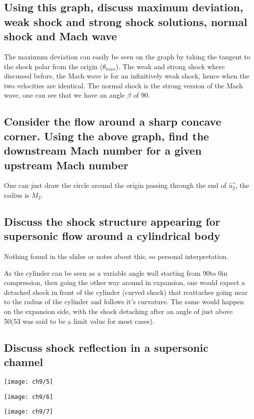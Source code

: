 \documentclass[british,french,11pt, a4paper, openany]{article}
\begin{document}
\subsection{Using this graph, discuss maximum deviation, weak shock and strong shock solutions, normal shock and Mach wave}
The maximum deviation can easily be seen on the graph by taking the tangent to the shock polar from the origin ($\theta_{max}$). The weak and strong shock where discussed before, the Mach wave is for an infinitively weak shock, hence when the two velocities are identical. The normal shock is the strong version of the Mach wave, one can see that we have an angle $\beta$ of 90\degres .

\subsection{Consider the flow around a sharp concave corner. Using the above graph,	find the downstream Mach number for a given upstream Mach number}
One can just draw the circle around the origin passing through the end of $\vec{u_2}$, the radius is $M_2$.

\subsection{Discuss the shock structure appearing for supersonic flow around a cylindrical body}
Nothing found in the slides or notes about this, so personal interpretation.

As the cylinder can be seen as a variable angle wall starting from 90\degres to 0\degres in compression, then going the other way around in expansion, one would expect a detached shock in front of the cylinder (curved shock) that reattaches going near to the radius of the cylinder and follows it's curvature. The same would happen on the expansion side, with the shock detaching after an angle of just above 50\degres (53 was said to be a limit value for most cases).


\subsection{Discuss shock reflection in a supersonic channel}
\begin{center}
	\begin{minipage}{0.33\textwidth}
		\texttt{[image: ch9/5]}
	\end{minipage}
	\begin{minipage}{0.35\textwidth}
		\texttt{[image: ch9/6]}
	\end{minipage}
	\begin{minipage}{0.25\textwidth}
		\texttt{[image: ch9/7]}
	\end{minipage}
\end{center}
\end{document}
